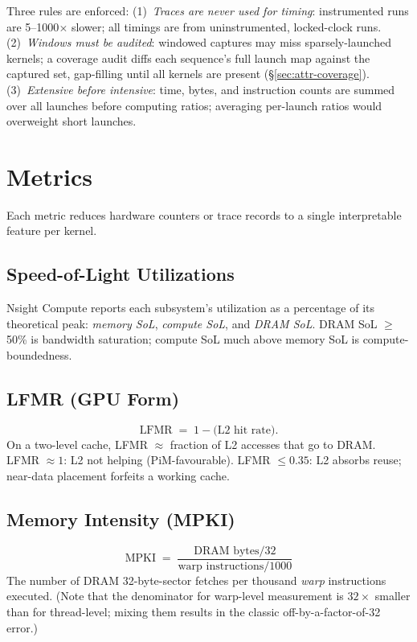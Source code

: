 Three rules are enforced: (1)~\emph{Traces are never used for timing}: instrumented runs are 5--1000$\times$ slower; all timings are from uninstrumented, locked-clock runs. (2)~\emph{Windows must be audited}: windowed captures may miss sparsely-launched kernels; a coverage audit diffs each sequence's full launch map against the captured set, gap-filling until all kernels are present (\S\ref{sec:attr-coverage}). (3)~\emph{Extensive before intensive}: time, bytes, and instruction counts are summed over all launches before computing ratios; averaging per-launch ratios would overweight short launches.

\section{Metrics}
\label{sec:met-metrics}

Each metric reduces hardware counters or trace records to a single interpretable feature per kernel.

\subsection{Speed-of-Light Utilizations}
Nsight Compute reports each subsystem's utilization as a percentage of its theoretical peak: \emph{memory SoL}, \emph{compute SoL}, and \emph{DRAM SoL}. DRAM SoL $\geq$ 50\% is bandwidth saturation; compute SoL much above memory SoL is compute-boundedness.

\subsection{LFMR (GPU Form)}
\begin{equation}
\text{LFMR} \;=\; 1 - \text{(L2 hit rate)}.
\label{eq:lfmr}
\end{equation}
On a two-level cache, LFMR $\approx$ fraction of L2 accesses that go to DRAM. LFMR $\approx 1$: L2 not helping (PiM-favourable). LFMR $\leq 0.35$: L2 absorbs reuse; near-data placement forfeits a working cache.

\subsection{Memory Intensity (MPKI)}
\begin{equation}
\text{MPKI} \;=\; \frac{\text{DRAM bytes}/32}{\text{warp instructions}/1000}
\label{eq:mpki}
\end{equation}
The number of DRAM 32-byte-sector fetches per thousand \emph{warp} instructions executed. (Note that the denominator for warp-level measurement is $32\times$ smaller than for thread-level; mixing them results in the classic off-by-a-factor-of-32 error.)

